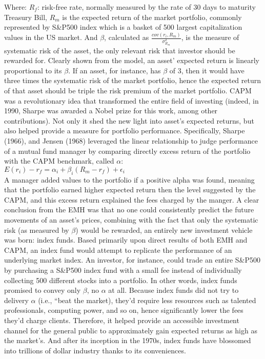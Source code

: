 Where: $R_f$: risk-free rate, normally measured by the rate of 30 days to maturity Treasury Bill, $R_m$ is the expected return of the market portfolio, commonly represented by S&P500 index which is a basket of 500 largest capitalization values in the US market. And $\beta$, calculated as $ \frac{cov(r_i, R_m)}{\sigma^2_{R_m}} $, is the measure of systematic risk of the asset, the only relevant risk that investor should be rewarded for. Clearly shown from the model, an asset’ expected return is linearly proportional to its $\beta$. If an asset, for instance, has $\beta$ of 3, then it would have three times the systematic risk of the market portfolio, hence the expected return of that asset should be triple the risk premium of the market portfolio.
CAPM was a revolutionary idea that transformed the entire field of investing (indeed, in 1990, Sharpe was awarded a Nobel prize for this work, among other contributions). Not only it shed the new light into asset’s expected returns, but also helped provide a measure for portfolio performance. Specifically, Sharpe (1966), and Jensen (1968) leveraged the linear relationship to judge performance of a mutual fund manager by comparing directly excess return of the portfolio with the CAPM benchmark, called $\alpha$:\\
$ E(r_i)- r_f = \alpha_i+\beta_i(R_m-r_f) + \epsilon_i $\\
A manager added values to the portfolio if a positive alpha was found, meaning that the portfolio earned higher expected return then the level suggested by the CAPM, and this excess return explained the fees charged by the manger. 
A clear conclusion from the EMH was that no one could consistently predict the future movements of an asset’s prices, combining with the fact that only the systematic risk (as measured by $\beta$) would be rewarded, an entirely new investment vehicle was born: index funds. Based primarily upon direct results of both EMH and CAPM, an index fund would attempt to replicate the performance of an underlying market index. An investor, for instance, could trade an entire S&P500 by purchasing a S&P500 index fund with a small fee instead of individually collecting 500 different stocks into a portfolio. In other words, index funds promised to convey only $\beta$, no $\alpha$ at all. Because index funds did not try to delivery $\alpha$ (i.e., “beat the market), they’d require less resources such as talented professionals, computing power, and so on, hence significantly lower the fees they’d charge clients. Therefore, it helped provide an accessible investment channel for the general public to approximately gain expected returns as high as the market’s. And after its inception in the 1970s, index funds have blossomed into trillions of dollar industry thanks to its conveniences. 

